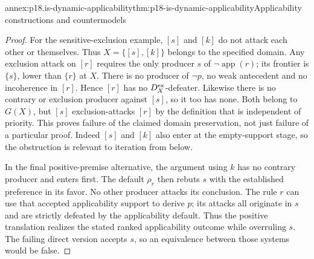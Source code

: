 \begin{annexitem}{annex:p18.is-dynamic-applicability}{thm:p18-is-dynamic-applicability}{Applicability constructions and countermodels}
\begin{proof}
For the sensitive-exclusion example, \([s]\) and \([k]\)
do not attack each other or themselves. Thus
\(X=\{[s],[k]\}\) belongs to the specified domain.
Any exclusion attack on \([r]\) requires the only producer
\(s\) of \(\neg\operatorname{app}(r)\); its frontier is
\(\{s\}\), lower than \(\{r\}\) at \(X\).
There is no producer of \(\neg p\), no weak antecedent and
no incoherence in \([r]\). Hence \([r]\) has no
\(D_X^{\rm ex}\)-defeater. Likewise there is no contrary or
exclusion producer against \([s]\), so it too has none.
Both belong to \(G(X)\), but \([s]\) exclusion-attacks
\([r]\) by the definition that is independent of priority.
This proves failure of the claimed domain preservation,
not just failure of a particular proof.
Indeed \([s]\) and \([k]\) also enter at the empty-support
stage, so the obstruction is relevant to iteration from below.

In the final positive-premise alternative, the argument using
\(k\) has no contrary producer and enters first.
The default \(\rho_r\) then rebuts \(s\) with the established
preference in its favor. No other producer attacks its conclusion.
The rule \(r\) can use that accepted applicability support to
derive \(p\); its attacks all originate in \(s\) and are
strictly defeated by the applicability default.
Thus the positive translation realizes the stated ranked
applicability outcome while overruling \(s\).
The failing direct version accepts \(s\), so an equivalence
between those systems would be false.
\end{proof}
\end{annexitem}
